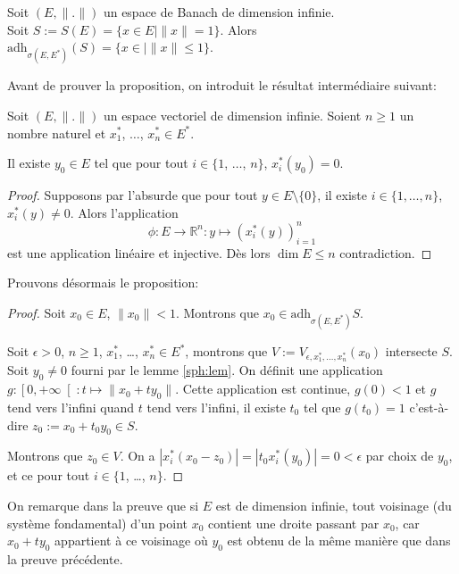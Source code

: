 \begin{prop}
  Soit $(E, \|.\|)$ un espace de Banach de dimension infinie.\\
  Soit $S := S(E) = \{x\in E\mid \|x\| = 1\}$. Alors
  $\mathrm{adh}_{\sigma(E, E^*)}(S) = \{x\in \mid \|x\|\leq 1\}$.
\end{prop}
Avant de prouver la proposition, on introduit le résultat intermédiaire
suivant:
\begin{lem}
  Soit $(E, \|.\|)$ un espace vectoriel de dimension infinie. Soient
  $n\geq 1$ un nombre naturel et $x_1^*$, $\ldots$, $x_n^*\in E^*$.

  Il existe $y_0\in E$ tel que pour tout $i\in \{1$, $\ldots$, $n\}$,
  $x_i^*(y_0)=0$.
\end{lem}

\begin{proof}\label{sph:lem}
  Supposons par l'absurde que pour tout $y\in E\setminus \{0\}$,
  il existe $i\in\{1, \ldots, n\}$, $x_i^*(y)\neq 0$. Alors l'application
  $$\phi: E\to\mathbb{R}^n: y\mapsto (x_i^*(y))_{i=1}^n$$
  est une application linéaire et injective. Dès lors $\dim E\leq n$
  contradiction.
\end{proof}

Prouvons désormais le proposition:
\begin{proof}
  Soit $x_0\in E$, $\|x_0\| < 1$. Montrons que
  $x_0\in \mathrm{adh}_{\sigma(E, E^*)}S$.

  Soit $\epsilon >0$, $n\geq 1$, $x_1^*$, \ldots, $x_n^*\in E^*$,
  montrons que $V:=V_{\epsilon, x_1^*, \ldots, x_n^*}(x_0)$ intersecte $S$.
  Soit $y_0\neq 0$ fourni par le lemme \ref{sph:lem}. On définit une
  application $g:\left[0, +\infty\right[: t\mapsto \|x_0 + ty_0\|$.
  Cette application est continue, $g(0)<1$ et $g$ tend vers l'infini
  quand $t$ tend vers l'infini, il existe $t_0$ tel que $g(t_0) = 1$
  c'est-à-dire $z_0:=x_0 + t_0y_0\in S$.

  Montrons que $z_0\in V$. On a $|x_i^*(x_0 - z_0)|= |t_0x^*_i(y_0)| =
  0 < \epsilon$ par choix de $y_0$, et ce pour tout $i\in\{1$, \ldots, $n\}$.
\end{proof}

\begin{rem}
  On remarque dans la preuve que si $E$ est de dimension infinie,
  tout voisinage (du système fondamental) d'un point $x_0$ contient
  une droite passant par $x_0$, car $x_0 + ty_0$ appartient à ce voisinage
  où $y_0$ est obtenu de la même manière que dans la preuve précédente.
\end{rem}

